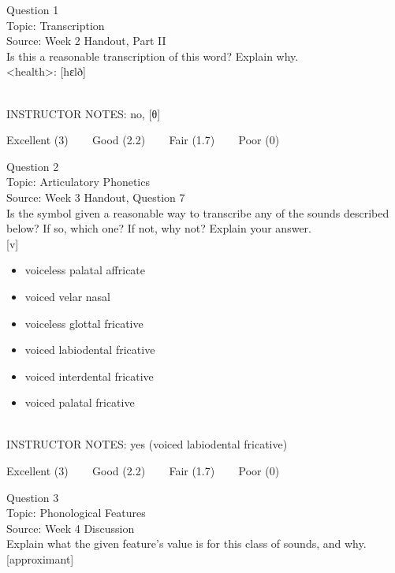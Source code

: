 \documentclass[12pt]{article}
\begin{document}
{\large Question 1}\\

Topic: Transcription\\
Source: Week 2 Handout, Part II\\

Is this a reasonable transcription of this word? Explain why.\\

<health>: {[hɛlð]}


~\\
INSTRUCTOR NOTES: no, [θ]


\vfill
Excellent (3) ~~~ Good (2.2) ~~~ Fair (1.7) ~~~ Poor (0)
\newpage

{\large Question 2}\\

Topic: Articulatory Phonetics\\
Source: Week 3 Handout, Question 7\\

Is the symbol given a reasonable way to transcribe any of the sounds described below? If so, which one? If not, why not? Explain your answer.\\

{[v]}

\begin{itemize} \item voiceless palatal affricate \item voiced velar nasal \item voiceless glottal fricative \item voiced labiodental fricative \item voiced interdental fricative \item voiced palatal fricative \end{itemize}


~\\
INSTRUCTOR NOTES: yes (voiced labiodental fricative)


\vfill
Excellent (3) ~~~ Good (2.2) ~~~ Fair (1.7) ~~~ Poor (0)
\newpage

{\large Question 3}\\

Topic: Phonological Features\\
Source: Week 4 Discussion\\

Explain what the given feature’s value is for this class of sounds, and why.\\

{[approximant]}
\end{document}
